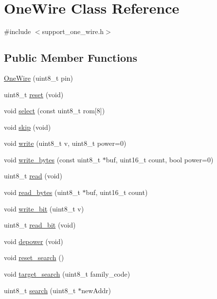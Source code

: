 \hypertarget{class_one_wire}{}\section{One\+Wire Class Reference}
\label{class_one_wire}


{\ttfamily \#include $<$support\+\_\+one\+\_\+wire.\+h$>$}

\subsection*{Public Member Functions}
\begin{DoxyCompactItemize}
\item 
\hyperlink{class_one_wire_aa3f23dc51d861a8d257648c507b14e8d}{One\+Wire} (uint8\+\_\+t pin)
\item 
uint8\+\_\+t \hyperlink{class_one_wire_a6a742a9112392567eae3d06dde067c07}{reset} (void)
\item 
void \hyperlink{class_one_wire_accf808390abd63d3c7bce35677784384}{select} (const uint8\+\_\+t rom\mbox{[}8\mbox{]})
\item 
void \hyperlink{class_one_wire_ae3780e2b0ea2ebf6be88298412ac7798}{skip} (void)
\item 
void \hyperlink{class_one_wire_a843e9e7e57ed615b4880be0b76b40b7d}{write} (uint8\+\_\+t v, uint8\+\_\+t power=0)
\item 
void \hyperlink{class_one_wire_a0fc1e0bdc2ab1f062c98567fa60a69ae}{write\+\_\+bytes} (const uint8\+\_\+t $\ast$buf, uint16\+\_\+t count, bool power=0)
\item 
uint8\+\_\+t \hyperlink{class_one_wire_afd9bdb8b5a5b69b394dfc76352e00e21}{read} (void)
\item 
void \hyperlink{class_one_wire_a2407440e8e25b624617593f8ad6447d4}{read\+\_\+bytes} (uint8\+\_\+t $\ast$buf, uint16\+\_\+t count)
\item 
void \hyperlink{class_one_wire_a6bbc58276d1cb08653dab3ea35378f94}{write\+\_\+bit} (uint8\+\_\+t v)
\item 
uint8\+\_\+t \hyperlink{class_one_wire_aeae4c2798b70d9d0ba3091c03ee2d056}{read\+\_\+bit} (void)
\item 
void \hyperlink{class_one_wire_aa8e0f62e830ad05d8035e55c7a309256}{depower} (void)
\item 
void \hyperlink{class_one_wire_aae5efdf67928b5ee312ab7d7906416fa}{reset\+\_\+search} ()
\item 
void \hyperlink{class_one_wire_a0a1b8457adb609a693b865dd474e5116}{target\+\_\+search} (uint8\+\_\+t family\+\_\+code)
\item 
uint8\+\_\+t \hyperlink{class_one_wire_a383dc74fc9f8a27b76366a2859c3820a}{search} (uint8\+\_\+t $\ast$new\+Addr)
\end{DoxyCompactItemize}

